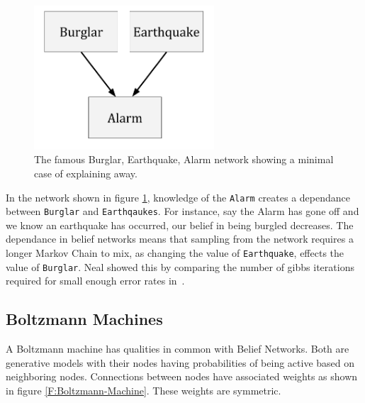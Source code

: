     \begin{figure}[h]
    \begin{center}
      \includegraphics[width = 0.6\textwidth]{Assets/Explaining_Away.png}
    \caption{The famous Burglar, Earthquake, Alarm network showing a minimal case of explaining away.}
    \label{F:Explaining-Away}
    \end{center}
    \end{figure}


    In the network shown in figure \ref{F:Explaining-Away}, knowledge of the \texttt{Alarm} creates a dependance between \texttt{Burglar} and \texttt{Earthqaukes}. For instance, say the Alarm has gone off and we know an earthquake has occurred, our belief in being burgled decreases. The dependance in belief networks means that sampling from the network requires a longer Markov Chain to mix, as changing the value of \texttt{Earthquake}, effects the value of \texttt{Burglar}.  Neal showed this by comparing the number of gibbs iterations required for small enough error rates in~\cite{neal1992:connectionist}.

  \subsection{Boltzmann Machines}

A Boltzmann machine   has qualities in common with Belief Networks. Both are generative models with their nodes having probabilities of being active based on neighboring nodes. Connections between nodes have associated weights as shown in figure \ref{F:Boltzmann-Machine}. These weights are symmetric.

